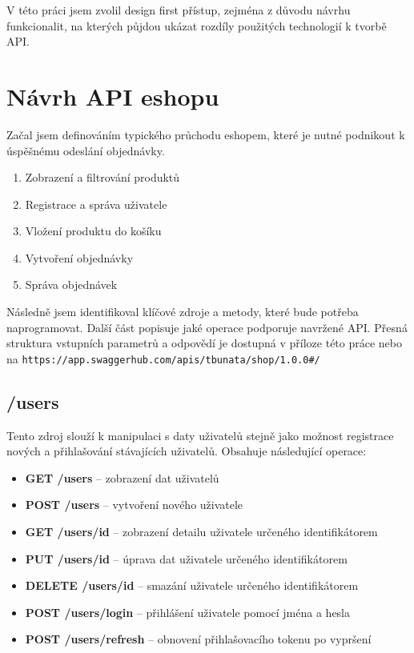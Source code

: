 \documentclass[thesis=M,czech]{FITthesis}[2019/12/23]
\begin{document}
V této práci jsem zvolil design first přístup, zejména z důvodu návrhu funkcionalit, na kterých půjdou ukázat rozdíly použitých technologií k tvorbě API.

\section{Návrh API eshopu}

Začal jsem definováním typického průchodu eshopem, které je nutné podnikout k úspěšnému odeslání objednávky.

\begin{enumerate}
  \item Zobrazení a filtrování produktů
  \item Registrace a správa uživatele
  \item Vložení produktu do košíku
  \item Vytvoření objednávky
  \item Správa objednávek
\end{enumerate}

Následně jsem identifikoval klíčové zdroje a metody, které bude potřeba naprogramovat. Další část popisuje jaké operace podporuje navržené API. Přesná struktura vstupních parametrů a odpovědí je dostupná v příloze této práce nebo na \texttt{https://app.swaggerhub.com/apis/tbunata/shop/1.0.0#/}

\subsection{/users}
Tento zdroj slouží k manipulaci s daty uživatelů stejně jako možnost registrace nových a přihlašování stávajících uživatelů. Obsahuje následující operace:

\begin{itemize}
  \item \textbf{GET /users} -- zobrazení dat uživatelů
  \item \textbf{POST /users} -- vytvoření nového uživatele
  \item \textbf{GET /users/{id}} -- zobrazení detailu uživatele určeného identifikátorem
  \item \textbf{PUT /users/{id}} -- úprava dat uživatele určeného identifikátorem
  \item \textbf{DELETE /users/{id}} -- smazání uživatele určeného identifikátorem
  \item \textbf{POST /users/login} -- přihlášení uživatele pomocí jména a hesla
  \item \textbf{POST /users/refresh} -- obnovení přihlašovacího tokenu po vypršení
\end{itemize}
\end{document}
